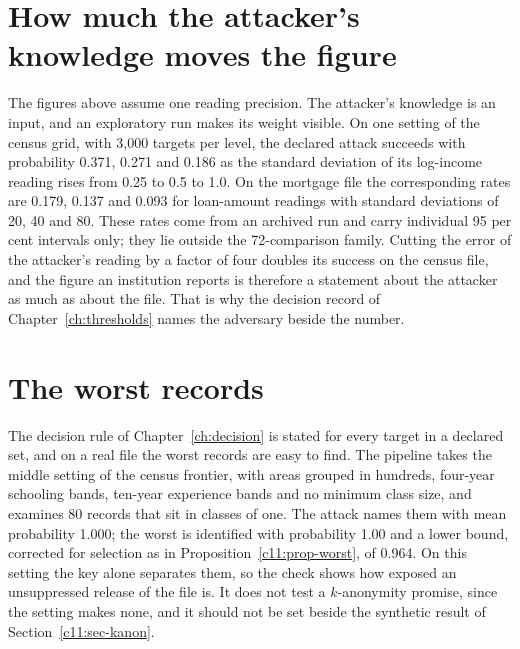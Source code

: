 \section{How much the attacker's knowledge moves the figure}

The figures above assume one reading precision. The attacker's knowledge is an input,
and an exploratory run makes its weight visible. On one setting of the census grid,
with 3,000 targets per level, the declared attack succeeds with probability 0.371,
0.271 and 0.186 as the standard deviation of its log-income reading rises from 0.25
to 0.5 to 1.0. On the mortgage file the corresponding rates are 0.179, 0.137 and 0.093
for loan-amount readings with standard deviations of 20, 40 and 80.
These rates come from an archived run and carry individual 95 per cent intervals only;
they lie outside the 72-comparison family. Cutting the error of the attacker's
reading by a factor of four doubles its success on the census file,
 and the figure an institution reports is
therefore a statement about the attacker as much as about the file. That is why the
decision record of Chapter~\ref{ch:thresholds} names the adversary beside the number.

\section{The worst records}

The decision rule of Chapter~\ref{ch:decision} is stated for every target in a declared
set, and on a real file the worst records are easy to find. The pipeline takes the
middle setting of the census frontier, with areas grouped in hundreds, four-year
schooling bands, ten-year experience bands and no minimum class size, and examines 80 records that sit in classes
of one. The attack names them with mean probability 1.000; the worst is identified with
probability 1.00 and a lower bound, corrected for selection as in
Proposition~\ref{c11:prop-worst}, of 0.964.
On this setting the key alone separates them, so the check shows how exposed an
unsuppressed release of the file is. It does not test a $k$-anonymity promise, since the
setting makes none, and it should not be set beside the synthetic result of
Section~\ref{c11:sec-kanon}.

